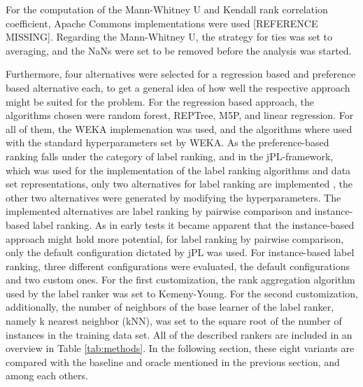 For the computation of the Mann-Whitney U and Kendall rank correlation coefficient, Apache Commons implementations were used [REFERENCE MISSING]. Regarding the Mann-Whitney U, the strategy for ties was set to averaging, and the NaNs were set to be removed before the analysis was started.

Furthermore, four alternatives were selected for a regression based and preference based alternative each, to get a general idea of how well the respective approach might be suited for the problem. For the regression based approach, the algorithms chosen were random forest, REPTree, M5P, and linear regression. For all of them, the WEKA implemenation \cite{hall2009weka} was used, and the algorithms where used with the standard hyperparameters set by WEKA. As the preference-based ranking falls under the category of label ranking, and in the jPL-framework, which was used for the implementation of the label ranking algorithms and data set representations, only two alternatives for label ranking are implemented \cite{intelligent2017jpl}, the other two alternatives were generated by modifying the hyperparameters. The implemented alternatives are label ranking by pairwise comparison and instance-based label ranking. As in early tests it became apparent that the instance-based approach might hold more potential, for label ranking by pairwise comparison, only the default configuration dictated by jPL was used. For instance-based label ranking, three different configurations were evaluated, the default configurations and two custom ones. For the first customization, the rank aggregation algorithm used by the label ranker was set to Kemeny-Young. For the second customization, additionally, the number of neighbors of the base learner of the label ranker, namely k nearest neighbor (kNN), was set to the square root of the number of instances in the training data set. All of the described rankers are included in an overview in Table \ref{tab:methods}. In the following section, these eight variants are compared with the baseline and oracle mentioned in the previous section, and among each others.

